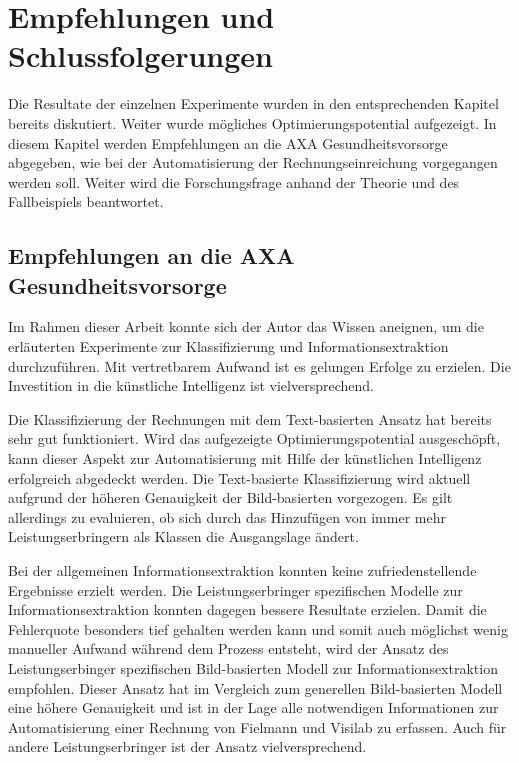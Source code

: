 \cleardoublepage
\section{Empfehlungen und Schlussfolgerungen}
\label{chap:summary}

Die Resultate der einzelnen Experimente wurden in den entsprechenden Kapitel bereits diskutiert. Weiter wurde mögliches Optimierungspotential aufgezeigt. In diesem Kapitel werden Empfehlungen an die AXA Gesundheitsvorsorge abgegeben, wie bei der Automatisierung der Rechnungseinreichung vorgegangen werden soll. Weiter wird die Forschungsfrage anhand der Theorie und des Fallbeispiels beantwortet.

\subsection{Empfehlungen an die AXA Gesundheitsvorsorge}

Im Rahmen dieser Arbeit konnte sich der Autor das Wissen aneignen, um die erläuterten Experimente zur Klassifizierung und Informationsextraktion durchzuführen. Mit vertretbarem Aufwand ist es gelungen Erfolge zu erzielen. Die Investition in die künstliche Intelligenz ist vielversprechend.

Die Klassifizierung der Rechnungen mit dem Text-basierten Ansatz hat bereits sehr gut funktioniert. Wird das aufgezeigte Optimierungspotential ausgeschöpft, kann dieser Aspekt zur Automatisierung mit Hilfe der künstlichen Intelligenz erfolgreich abgedeckt werden. Die Text-basierte Klassifizierung wird aktuell aufgrund der höheren Genauigkeit der Bild-basierten vorgezogen. Es gilt allerdings zu evaluieren, ob sich durch das Hinzufügen von immer mehr Leistungserbringern als Klassen die Ausgangslage ändert.

Bei der allgemeinen Informationsextraktion konnten keine zufriedenstellende Ergebnisse erzielt werden. Die Leistungserbringer spezifischen Modelle zur Informationsextraktion konnten dagegen bessere Resultate erzielen. Damit die Fehlerquote besonders tief gehalten werden kann und somit auch möglichst wenig manueller Aufwand während dem Prozess entsteht, wird der Ansatz des Leistungserbinger spezifischen Bild-basierten Modell zur Informationsextraktion empfohlen. Dieser Ansatz hat im Vergleich zum generellen Bild-basierten Modell eine höhere Genauigkeit und ist in der Lage alle notwendigen Informationen zur Automatisierung einer Rechnung von Fielmann und Visilab zu erfassen. Auch für andere Leistungserbringer ist der Ansatz vielversprechend.


